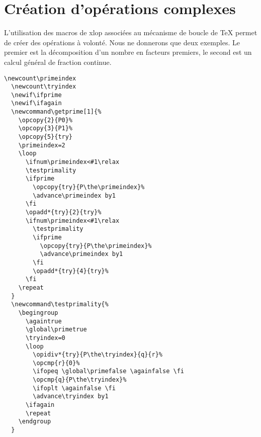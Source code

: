 \documentclass[12pt]{report}
\newcommand\package[1]{\textsf{#1}}
\begin{document}
\section{Création d'opérations complexes}
\label{sec:Creation d'operations complexes}
L'utilisation des macros de \package{xlop} associées au mécanisme de
boucle de \TeX{} permet de créer des opérations à volonté. Nous ne
donnerons que deux exemples. Le premier est la décomposition d'un
nombre en facteurs premiers, le second est un calcul général de
fraction continue.%
\begin{Verbatim}[xrightmargin=0pt]
  \newcount\primeindex
  \newcount\tryindex
  \newif\ifprime
  \newif\ifagain
  \newcommand\getprime[1]{%
    \opcopy{2}{P0}%
    \opcopy{3}{P1}%
    \opcopy{5}{try}
    \primeindex=2
    \loop
      \ifnum\primeindex<#1\relax
      \testprimality
      \ifprime
        \opcopy{try}{P\the\primeindex}%
        \advance\primeindex by1
      \fi
      \opadd*{try}{2}{try}%
      \ifnum\primeindex<#1\relax
        \testprimality
        \ifprime
          \opcopy{try}{P\the\primeindex}%
          \advance\primeindex by1
        \fi
        \opadd*{try}{4}{try}%
      \fi
    \repeat
  }
  \newcommand\testprimality{%
    \begingroup
      \againtrue
      \global\primetrue
      \tryindex=0
      \loop
        \opidiv*{try}{P\the\tryindex}{q}{r}%
        \opcmp{r}{0}%
        \ifopeq \global\primefalse \againfalse \fi
        \opcmp{q}{P\the\tryindex}%
        \ifoplt \againfalse \fi
        \advance\tryindex by1
      \ifagain
      \repeat
    \endgroup
  }
\end{Verbatim}
\newcount\primeindex
\newcount\tryindex
\newif\ifprime
\newif\ifagain
\newcommand\getprime[1]{%
  \opcopy{2}{P0}%
  \opcopy{3}{P1}%
  \opcopy{5}{try}
  \primeindex=2
  \loop
  \ifnum\primeindex<#1\relax
    \testprimality
    \ifprime
      \opcopy{try}{P\the\primeindex}%
      \advance\primeindex by1
    \fi
    \opadd*{try}{2}{try}%
    \ifnum\primeindex<#1\relax
      \testprimality
      \ifprime
        \opcopy{try}{P\the\primeindex}%
        \advance\primeindex by1
      \fi
      \opadd*{try}{4}{try}%
    \fi
  \repeat
}
\newcommand\testprimality{%
  \begingroup
    \againtrue
    \global\primetrue
    \tryindex=0
    \loop
      \opidiv*{try}{P\the\tryindex}{q}{r}%
      \opcmp{r}{0}%
      \ifopeq \global\primefalse \againfalse \fi
      \opcmp{q}{P\the\tryindex}%
      \ifoplt \againfalse \fi
      \advance\tryindex by1
    \ifagain
    \repeat
  \endgroup
}
\end{document}
